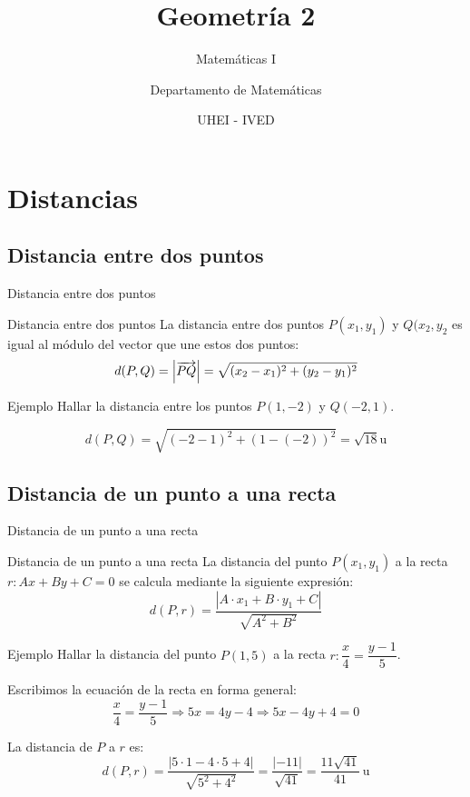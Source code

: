 \documentclass[8pt]{beamer}
\title{Geometría 2}
\subtitle{Matemáticas I}
\author{Departamento de Matemáticas}
\date{ UHEI - IVED}
\begin{document}
\titleframe

\begin{frame}
\tableofcontents
\end{frame}

\section{Distancias}
\subsection{Distancia entre dos puntos}

\begin{frame}[t]{Distancia entre dos puntos}
\begin{alertblock}{Distancia entre dos puntos}
La distancia entre dos puntos $P(x_1,y_1)$ y $Q(x_2,y_2$ es igual al módulo del vector que une estos dos puntos:
\[ d(P,Q)= \left| \overrightarrow{PQ} \right| = \sqrt{(x_2-x_1)^2+(y_2-y_1)^2} \]
\end{alertblock}

\pause

\begin{exampleblock}{Ejemplo}
Hallar la distancia entre los puntos $P(1,-2)$ y $Q(-2,1)$.
\end{exampleblock}

\pause

\[d(P,Q)=\sqrt{(-2-1)^2+ (1-(-2))^2}= \sqrt{18} \text{u} \]
\end{frame}

\subsection{Distancia de un punto a una recta}
\begin{frame}[t]{Distancia de un punto a una recta}

\begin{alertblock}{Distancia de un punto a una recta}
La distancia del punto $P(x_1,y_1)$ a la recta $r : Ax+By+C=0$ se calcula mediante la siguiente expresión:
\[ d(P,r)=\dfrac{|A\cdot x_1+B\cdot y_1+C|}{\sqrt{A^2+B^2}} \]
\end{alertblock}
\pause
\begin{exampleblock}{Ejemplo}
Hallar la distancia del punto $P(1,5)$ a la recta $r : \dfrac{x}{4}=\dfrac{y-1}{5}$.
\end{exampleblock}
\pause
Escribimos la ecuación de la recta en forma general:
\[ \dfrac{x}{4}=\dfrac{y-1}{5} \Rightarrow 5x=4y-4 \Rightarrow 5x-4y+4=0 \]

\pause
La distancia de $P$ a $r$ es:
\[ d(P,r)=\dfrac{|5\cdot 1 -4\cdot 5 +4 | }{\sqrt{5^2+4^2}}= \dfrac{|-11|}{\sqrt{41}}= \dfrac{11\sqrt{41}}{41} \, \text{u} \]
\end{frame}
\end{document}
